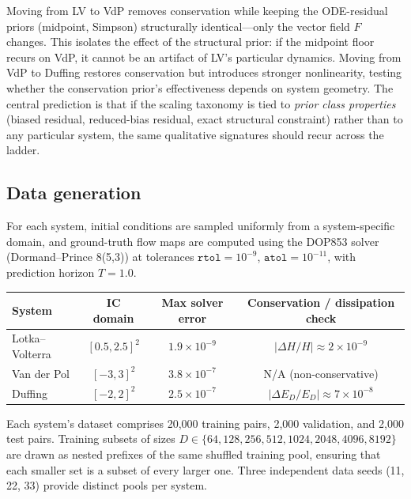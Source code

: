 \documentclass[11pt]{article}
\begin{document}
Moving from LV to VdP removes conservation while keeping the ODE-residual priors (midpoint, Simpson) structurally identical---only the vector field $F$ changes.
This isolates the effect of the structural prior: if the midpoint floor recurs on VdP, it cannot be an artifact of LV's particular dynamics.
Moving from VdP to Duffing restores conservation but introduces stronger nonlinearity, testing whether the conservation prior's effectiveness depends on system geometry.
The central prediction is that if the scaling taxonomy is tied to \emph{prior class properties} (biased residual, reduced-bias residual, exact structural constraint) rather than to any particular system, the same qualitative signatures should recur across the ladder.

\subsection{Data generation}

For each system, initial conditions are sampled uniformly from a system-specific domain, and ground-truth flow maps are computed using the DOP853 solver (Dormand--Prince 8(5,3)) at tolerances $\texttt{rtol} = 10^{-9}$, $\texttt{atol} = 10^{-11}$, with prediction horizon $T = 1.0$.

\begin{center}
\begin{tabular}{lccc}
\toprule
System & IC domain & Max solver error & Conservation / dissipation check \\
\midrule
Lotka--Volterra & $[0.5, 2.5]^2$ & $1.9 \times 10^{-9}$ & $|\Delta H/H| \approx 2 \times 10^{-9}$ \\
Van der Pol & $[-3, 3]^2$ & $3.8 \times 10^{-7}$ & N/A (non-conservative) \\
Duffing & $[-2, 2]^2$ & $2.5 \times 10^{-7}$ & $|\Delta E_D/E_D| \approx 7 \times 10^{-8}$ \\
\bottomrule
\end{tabular}
\end{center}

Each system's dataset comprises 20{,}000 training pairs, 2{,}000 validation, and 2{,}000 test pairs.
Training subsets of sizes $D \in \{64, 128, 256, 512, 1024, 2048, 4096, 8192\}$ are drawn as nested prefixes of the same shuffled training pool, ensuring that each smaller set is a subset of every larger one.
Three independent data seeds (11, 22, 33) provide distinct pools per system.

\end{document}
